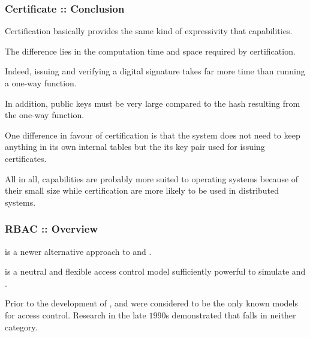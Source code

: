 
\begin{frame}
  \frametitle{Certificate :: Conclusion}

  Certification basically provides the same kind of expressivity that
  capabilities.

  \-

  The difference lies in the computation time and space required by
  certification.

  \-

  Indeed, issuing and verifying a digital signature takes far more time
  than running a one-way function.

  \-

  In addition, public keys must be very large compared to the hash resulting
  from the one-way function.

  \-

  One difference in favour of certification is that the system does not
  need to keep anything in its own internal tables but the its key pair used
  for issuing certificates.

  \-

  All in all, capabilities are probably more suited to operating systems
  because of their small size while certification are more likely to be used
  in distributed systems.
\end{frame}


\begin{frame}
  \frametitle{RBAC :: Overview}

   is a newer alternative
  approach to  and .

  \-

   is a neutral and flexible access control model sufficiently
  powerful to simulate  and .

  \-

  Prior to the development of ,  and  were
  considered to be the only known models for access control. Research in the
  late $1990$s demonstrated that  falls in neither category.
\end{frame}



